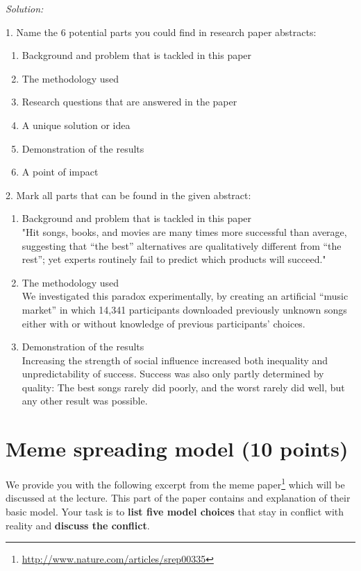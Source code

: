 \documentclass{WeSTassignment}
\begin{document}
\emph{Solution:}

1. Name the 6 potential parts you could find in research paper abstracts:
\begin{enumerate}
	\item Background and problem that is tackled in this paper
	\item The methodology used
	\item Research questions that are answered in the paper
	\item A unique solution or idea
	\item Demonstration of the results
	\item A point of impact
\end{enumerate}
2. Mark all parts that can be found in the given abstract: 
\begin{enumerate}
	\item Background and problem that is tackled in this paper \\
	"Hit songs, books, and movies are many times more successful than average, suggesting that “the best” alternatives are qualitatively different from ``the rest''; yet experts routinely fail to predict which products will succeed."
	\item The methodology used \\
	We investigated this paradox experimentally, by creating an artificial ``music
market'' in which 14,341 participants downloaded previously unknown songs
either with or without knowledge of previous participants’ choices.
	\item Demonstration of the results \\
	Increasing
the strength of social influence increased both inequality and unpredictability of success. Success was also only partly determined by quality: The best
songs rarely did poorly, and the worst rarely did well, but any other result
was possible.
\end{enumerate}





\section{Meme spreading model (10 points)}
We provide you with the following excerpt from the meme paper\footnote{ \url {http://www.nature.com/articles/srep00335} } which will be discussed at the lecture. This part of the paper contains and explanation of their basic model. Your task is to \textbf{list five model choices} that stay in conflict with reality and \textbf{discuss the conflict}. 
\end{document}
